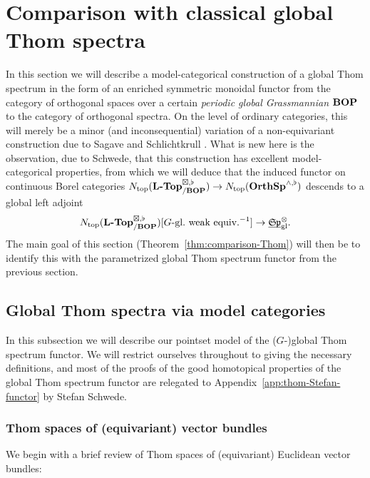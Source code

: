 \documentclass[reqno]{memo-l}
\theoremstyle{mythm}
\theoremstyle{definition}
\numberwithin{equation}{section}
\newcommand{\gl}{\textup{gl}}
\newcommand{\Ntop}{{N_\textup{top}}}
\newcommand{\cat}[1]{\textbf{\textup{#1}}}
\newcommand{\dual}{\flat}
\newcommand{\ulhelper}[2]{\underline{\setbox0=\hbox{$#1#2$}\dp0=0.4pt \box0\relax}}
\newcommand{\ul}[1]{{\mathpalette\ulhelper{#1}}\hbox{\rule[-2pt]{0pt}{0pt}}}
\let\smashp=\wedge
\newcommand{\mySp}{{\mathfrak S\kern-.5pt\mathfrak p}}
\newcommand{\osp}{{\textbf{\textup{OrthSp}}}}
\begin{document}
\section{Comparison with classical global Thom spectra}\label{sec:model-thom}
In this section we will describe a model-categorical construction of a global Thom spectrum in the form of an enriched symmetric monoidal functor from the category of orthogonal spaces over a certain \emph{periodic global Grassmannian} $\cat{BOP}$ to the category of orthogonal spectra. On the level of ordinary categories, this will merely be a minor (and inconsequential) variation of a non-equivariant construction due to Sagave and Schlichtkrull \cite{sagave-schlichtkrull-thom}. What is new here is the observation, due to Schwede, that this construction has excellent model-categorical properties, from which we will deduce that the induced functor on continuous Borel categories  $\Ntop(\cat{$\cat{L}$-Top}_{/\cat{BOP}}^{\boxtimes,\dual})\to\Ntop(\osp^{\smashp,\dual})$ descends to a global left adjoint
\[
    \Ntop(\cat{$\cat{L}$-Top}_{/\cat{BOP}}^{\boxtimes,\dual})[\text{$G$-gl.~weak equiv.}^{-1}]\to\ul\mySp_\gl^\otimes.
\]
The main goal of this section (Theorem~\ref{thm:comparison-Thom}) will then be to identify this with the parametrized global Thom spectrum functor from the previous section.

\subsection{Global Thom spectra via model categories}\label{subsec:model-thom}
In this subsection we will describe our pointset model of the ($G$-)global Thom spectrum functor. We will restrict ourselves throughout to giving the necessary definitions, and most of the proofs of the good homotopical properties of the global Thom spectrum functor are relegated to Appendix~\ref{app:thom-Stefan-functor} by Stefan Schwede.

\medskip
\subsubsection{Thom spaces of (equivariant) vector bundles}
We begin with a brief review of Thom spaces of (equivariant) Euclidean vector bundles:
\end{document}
